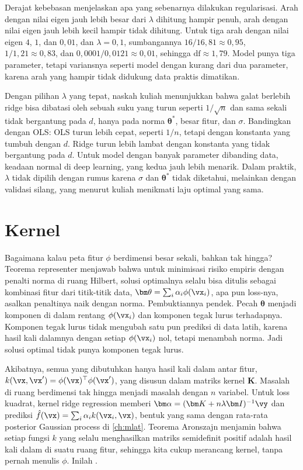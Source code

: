 Derajat kebebasan menjelaskan apa yang sebenarnya dilakukan regularisasi. Arah dengan nilai eigen jauh lebih besar dari $\lambda$
dihitung hampir penuh, arah dengan nilai eigen jauh lebih kecil hampir tidak dihitung. Untuk tiga arah dengan nilai eigen $4$, $1$,
dan $0{,}01$, dan $\lambda=0{,}1$, sumbangannya $16/16{,}81\approx0{,}95$, $1/1{,}21\approx0{,}83$, dan $0{,}0001/0{,}0121\approx0{,}01$,
sehingga $\mathrm{df}\approx1{,}79$. Model punya tiga parameter, tetapi variansnya seperti model dengan kurang dari dua parameter, karena
arah yang hampir tidak didukung data praktis dimatikan.

Dengan pilihan $\lambda$ yang tepat, naskah kuliah menunjukkan bahwa galat berlebih ridge bisa dibatasi oleh sebuah suku yang turun
seperti $1/\sqrt n$ dan sama sekali tidak bergantung pada $d$, hanya pada norma $\bm\theta^*$, besar fitur, dan $\sigma$. Bandingkan dengan
OLS: OLS turun lebih cepat, seperti $1/n$, tetapi dengan konstanta yang tumbuh dengan $d$. Ridge turun lebih lambat dengan konstanta
yang tidak bergantung pada $d$. Untuk model dengan banyak parameter dibanding data, keadaan normal di deep learning, yang kedua
jauh lebih menarik. Dalam praktik, $\lambda$ tidak dipilih dengan rumus karena $\sigma$ dan $\bm\theta^*$ tidak diketahui, melainkan
dengan validasi silang, yang menurut kuliah menikmati laju optimal yang sama.

\section{Kernel}

Bagaimana kalau peta fitur $\phi$ berdimensi besar sekali, bahkan tak hingga? Teorema representer menjawab bahwa untuk minimisasi
risiko empiris dengan penalti norma di ruang Hilbert, solusi optimalnya selalu bisa ditulis sebagai kombinasi fitur dari titik-titik
data, $\bm\theta=\sum_i\alpha_i\phi(\vx_i)$, apa pun loss-nya, asalkan penaltinya naik dengan norma. Pembuktiannya pendek. Pecah
$\bm\theta$ menjadi komponen di dalam rentang $\phi(\vx_i)$ dan komponen tegak lurus terhadapnya. Komponen tegak lurus tidak mengubah
satu pun prediksi di data latih, karena hasil kali dalamnya dengan setiap $\phi(\vx_i)$ nol, tetapi menambah norma. Jadi solusi
optimal tidak punya komponen tegak lurus.

Akibatnya, semua yang dibutuhkan hanya hasil kali dalam antar fitur, $k(\vx,\vx')=\phi(\vx)^\top\phi(\vx')$, yang disusun dalam matriks
kernel $\bm K$. Masalah di ruang berdimensi tak hingga menjadi masalah dengan $n$ variabel. Untuk loss kuadrat, kernel ridge regression
memberi $\bm\alpha=(\bm K+n\lambda\bm I)^{-1}\vy$ dan prediksi $\hat f(\vx)=\sum_i\alpha_ik(\vx_i,\vx)$, bentuk yang sama dengan rata-rata
posterior Gaussian process di \cref{ch:mlat}. Teorema Aronszajn menjamin bahwa setiap fungsi $k$ yang selalu menghasilkan matriks
semidefinit positif adalah hasil kali dalam di suatu ruang fitur, sehingga kita cukup merancang kernel, tanpa pernah menulis $\phi$.
Inilah .

